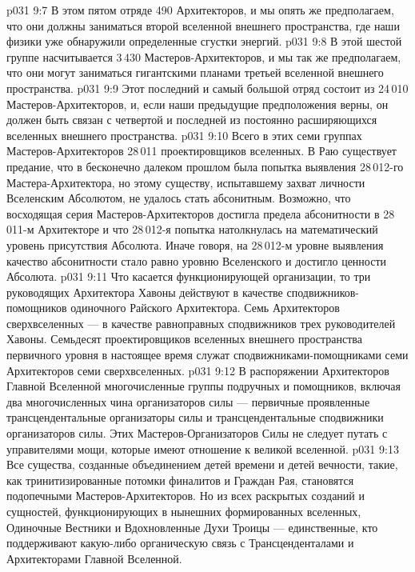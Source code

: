 \vs p031 9:7 \pc {}\bibnobreakspace {} В этом пятом отряде 490 Архитекторов, и мы опять же предполагаем, что они должны заниматься второй вселенной внешнего пространства, где наши физики уже обнаружили определенные сгустки энергий.
\vs p031 9:8 \pc {}\bibnobreakspace {} В этой шестой группе насчитывается 3\,430 Мастеров\hyp{}Архитекторов, и мы так же предполагаем, что они могут заниматься гигантскими планами третьей вселенной внешнего пространства.
\vs p031 9:9 \pc {}\bibnobreakspace {} Этот последний и самый большой отряд состоит из 24\,010 Мастеров\hyp{}Архитекторов, и, если наши предыдущие предположения верны, он должен быть связан с четвертой и последней из постоянно расширяющихся вселенных внешнего пространства.
\vs p031 9:10 \pc Всего в этих семи группах Мастеров\hyp{}Архитекторов 28\,011 проектировщиков вселенных. В Раю существует предание, что в бесконечно далеком прошлом была попытка выявления 28\,012\hyp{}го Мастера\hyp{}Архитектора, но этому существу, испытавшему захват личности Вселенским Абсолютом, не удалось стать абсонитным. Возможно, что восходящая серия Мастеров\hyp{}Архитекторов достигла предела абсонитности в 28\,011\hyp{}м Архитекторе и что 28\,012\hyp{}я попытка натолкнулась на математический уровень присутствия Абсолюта. Иначе говоря, на 28\,012\hyp{}м уровне выявления качество абсонитности стало равно уровню Вселенского и достигло ценности Абсолюта.
\vs p031 9:11 \pc Что касается функционирующей организации, то три руководящих Архитектора Хавоны действуют в качестве сподвижников\hyp{}помощников одиночного Райского Архитектора. Семь Архитекторов сверхвселенных --- в качестве равноправных сподвижников трех руководителей Хавоны. Семьдесят проектировщиков вселенных внешнего пространства первичного уровня в настоящее время служат сподвижниками\hyp{}помощниками семи Архитекторов семи сверхвселенных.
\vs p031 9:12 В распоряжении Архитекторов Главной Вселенной многочисленные группы подручных и помощников, включая два многочисленных чина организаторов силы --- первичные проявленные трансцендентальные организаторы силы и трансцендентальные сподвижники организаторов силы. Этих Мастеров\hyp{}Организаторов Силы не следует путать с управителями мощи, которые имеют отношение к великой вселенной.
\vs p031 9:13 Все существа, созданные объединением детей времени и детей вечности, такие, как тринитизированные потомки финалитов и Граждан Рая, становятся подопечными Мастеров\hyp{}Архитекторов. Но из всех раскрытых созданий и сущностей, функционирующих в нынешних формированных вселенных, Одиночные Вестники и Вдохновленные Духи Троицы --- единственные, кто поддерживают какую\hyp{}либо органическую связь с Трансценденталами и Архитекторами Главной Вселенной.
